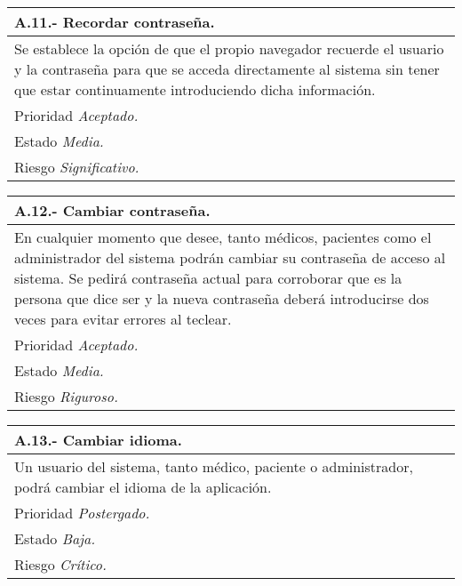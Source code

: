 	\begin{center}
	\begin{tabulary}{15cm}{|L|}
		\hline
			\bf{A.11.- Recordar contraseña.} \\
		\hline
			Se establece la opción de que el propio navegador recuerde el usuario y la contraseña para que se acceda directamente al sistema sin tener que estar continuamente introduciendo dicha información. \\
		\hline
			Prioridad \textit{Aceptado.} \\
		\hline
			Estado \textit{Media.} \\
		\hline
			Riesgo \textit{Significativo.} \\
		\hline
	\end{tabulary}
	\end{center}

	\begin{center}
	\begin{tabulary}{15cm}{|L|}
		\hline
			\bf{A.12.- Cambiar contraseña.} \\
		\hline
			En cualquier momento que desee, tanto médicos, pacientes como el administrador del sistema podrán cambiar su contraseña de acceso al sistema. Se pedirá contraseña actual para corroborar que es la persona que dice ser y la nueva contraseña deberá introducirse dos veces para evitar errores al teclear. \\
		\hline
			Prioridad \textit{Aceptado.} \\
		\hline
			Estado \textit{Media.} \\
		\hline
			Riesgo \textit{Riguroso.} \\
		\hline
	\end{tabulary}
	\end{center}

	\begin{center}
	\begin{tabulary}{15cm}{|L|}
		\hline
			\bf{A.13.- Cambiar idioma.} \\
		\hline
			Un usuario del sistema, tanto médico, paciente o administrador, podrá cambiar el idioma de la aplicación. \\
		\hline
			Prioridad \textit{Postergado.} \\
		\hline
			Estado \textit{Baja.} \\
		\hline
			Riesgo \textit{Crítico.} \\
		\hline
	\end{tabulary}
	\end{center}


